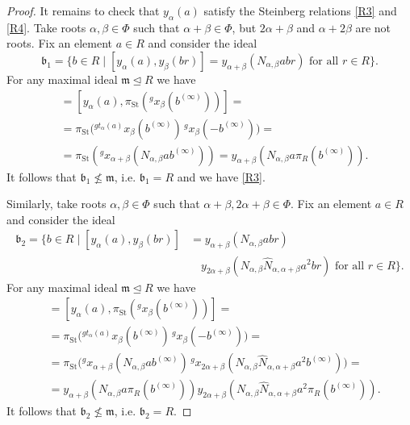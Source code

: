 \documentclass{article}
\numberwithin{equation}{section}
\theoremstyle{definition}
\theoremstyle{remark}
\DeclareMathOperator\St{St}
\newcommand{\up}[2]{{^{#1}\!{#2}}}
\begin{document}
\begin{proof}
 It remains to check that \(y_\alpha(a)\) satisfy the Steinberg relations \ref{R3} and \ref{R4}. Take roots \(\alpha, \beta \in \Phi\) such that \(\alpha + \beta \in \Phi\), but \(2\alpha + \beta\) and \(\alpha + 2\beta\) are not roots. Fix an element \(a \in R\) and consider the ideal
 \[\mathfrak b_1 = \{b \in R \mid [y_\alpha(a), y_\beta(br)] = y_{\alpha + \beta}(N_{\alpha, \beta} abr) \text{ for all } r \in R\}.\]
 For any maximal ideal \(\mathfrak m \trianglelefteq R\) we have
 \begin{align*}
 [y_\alpha(a), y_\beta(\pi_R(b^{(\infty)}))] &= [y_\alpha(a), \pi_{\St}(\up g{x_\beta(b^{(\infty)})})] =\\
 &= \pi_{\St}\bigl(\up{g t_\alpha(a)}{x_\beta(b^{(\infty)})}\, \up g{x_\beta(-b^{(\infty)})}\bigr) =\\
 &= \pi_{\St}(\up g{x_{\alpha + \beta}(N_{\alpha, \beta} a b^{(\infty)})}) = y_{\alpha + \beta}(N_{\alpha, \beta} a \pi_R(b^{(\infty)})).
 \end{align*}
 It follows that \(\mathfrak b_1 \not \leq \mathfrak m\), i.e. \(\mathfrak b_1 = R\) and we have \ref{R3}.

 Similarly, take roots \(\alpha, \beta \in \Phi\) such that \(\alpha + \beta, 2\alpha + \beta \in \Phi\). Fix an element \(a \in R\) and consider the ideal
 \begin{align*}
 \mathfrak b_2 = \{b \in R \mid [y_\alpha(a), y_\beta(br)] &= y_{\alpha + \beta}(N_{\alpha, \beta} abr)\\
 &\quad y_{2\alpha + \beta}(N_{\alpha, \beta} \widehat N_{\alpha, \alpha + \beta} a^2 br) \text{ for all } r \in R\}.
 \end{align*}
 For any maximal ideal \(\mathfrak m \trianglelefteq R\) we have
 \begin{align*}
 [y_\alpha(a), y_\beta(\pi_R(b^{(\infty)}))] &= [y_\alpha(a), \pi_{\St}(\up g{x_\beta(b^{(\infty)})})] =\\
 &= \pi_{\St}\bigl(\up{g t_\alpha(a)}{x_\beta(b^{(\infty)})}\, \up g{x_\beta(-b^{(\infty)})}\bigr) =\\
 &= \pi_{\St}\bigl(\up g{x_{\alpha + \beta}(N_{\alpha, \beta} a b^{(\infty)})}\, \up g{x_{2\alpha + \beta}(N_{\alpha, \beta} \widehat N_{\alpha, \alpha + \beta} a^2 b^{(\infty)})}\bigr) =\\
 &= y_{\alpha + \beta}(N_{\alpha, \beta} a \pi_R(b^{(\infty)})) y_{2\alpha + \beta}(N_{\alpha, \beta} \widehat N_{\alpha, \alpha + \beta} a^2 \pi_R(b^{(\infty)})).
 \end{align*}
 It follows that \(\mathfrak b_2 \not \leq \mathfrak m\), i.e. \(\mathfrak b_2 = R\).
\end{proof}


\printbibliography
\end{document}
